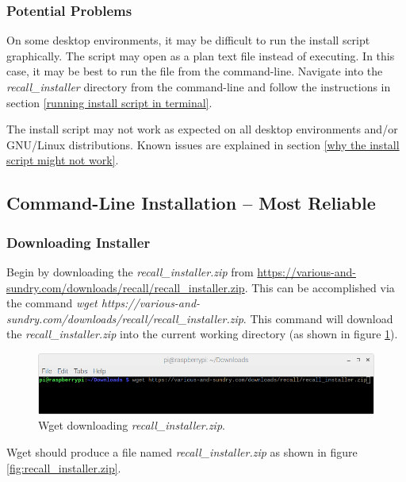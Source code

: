 \documentclass[letterpaper]{article}
\begin{document}
\subsubsection{Potential Problems}
On some desktop environments, it may be difficult to run the install script graphically. The script may open as a plan text file instead of executing. In this case, it may be best to run the file from the command-line. Navigate into the \textit{recall\_installer} directory from the command-line and follow the instructions in section \ref{running install script in terminal}.

The install script may not work as expected on all desktop environments and/or GNU/Linux distributions. Known issues are explained in section \ref{why the install script might not work}.

\subsection{Command-Line Installation -- Most Reliable} \label{command_line_install}
\subsubsection{Downloading Installer} \label{running the install script in a terminal}
Begin by downloading the \textit{recall\_installer.zip} from \href{https://various-and-sundry.com/downloads/recall/recall_installer.zip}{https://various-and-sundry.com/downloads/recall/recall\_installer.zip}. This can be accomplished via the command \textit{wget https://various-and-sundry.com/downloads/recall/recall\_installer.zip}. This command will download the \textit{recall\_installer.zip} into the current working directory (as shown in figure \ref{fig:wget_recall_installer.zip}).

\begin{figure}[H]
  \centering
  \includegraphics[width=14cm]{images/command_line_install/wget_recall_installer.png}
  \caption{Wget downloading \textit{recall\_installer.zip}.}
  \label{fig:wget_recall_installer.zip}
\end{figure}

Wget should produce a file named \textit{recall\_installer.zip} as shown in figure \ref{fig:recall_installer.zip}.
\end{document}
